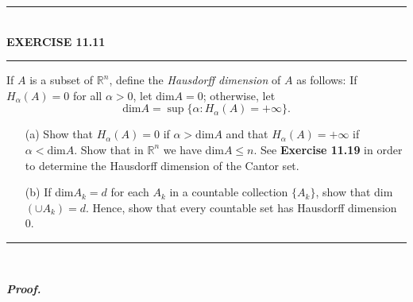 \documentclass[a4paper,11pt]{article}
\begin{document}
	\begin{flushleft}
		\rule[-0.5ex]{17cm}{2pt}\\
			\textbf{EXERCISE 11.11}\\
		\rule[1.5ex]{17cm}{0.5pt}
			If $A$ is a subset of $\mathbb{R}^n$, define the \textit{Hausdorff dimension} of $A$ as follows: If $H_\alpha(A) = 0$ for all $\alpha > 0$, let dim$A = 0$; otherwise, let
				$$\text{dim}A = \sup \{\alpha: H_\alpha(A) = +\infty\}.$$
			\begin{enumerate}
				\item[(a)] Show that $H_\alpha(A) = 0$ if $\alpha > \text{dim}A$ and that $H_\alpha(A) = +\infty$ if $\alpha < \text{dim}A$. Show that in $\mathbb{R}^n$ we have dim$A \leq n$. See \textbf{Exercise 11.19} in order to determine the Hausdorff dimension of the Cantor set.

				\item[(b)] If dim$A_k = d$ for each $A_k$ in a countable collection $\{A_k\}$, show that dim$(\cup A_k) = d$. Hence, show that every countable set has Hausdorff dimension 0.
			\end{enumerate}
		\rule[1.0ex]{17cm}{0.5pt}\
	\end{flushleft}
	\textbf{\textit{Proof.}}
\end{document}
